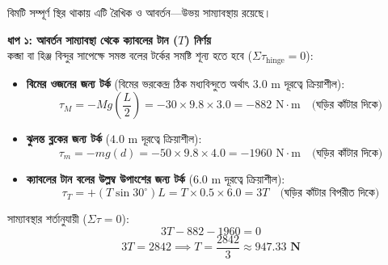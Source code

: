 \documentclass[12pt, a4paper]{article}
\begin{document}
\begin{tcolorbox}[solutionbox={সমাধান (Solution)}]
\noindent
বিমটি সম্পূর্ণ স্থির থাকায় এটি রৈখিক ও আবর্তন—উভয় সাম্যাবস্থায় রয়েছে।

\vspace{0.5em}
\noindent
\textbf{ধাপ ১: আবর্তন সাম্যাবস্থা থেকে ক্যাবলের টান ($T$) নির্ণয়} \\
কব্জা বা হিঞ্জ বিন্দুর সাপেক্ষে সমস্ত বলের টর্কের সমষ্টি শূন্য হতে হবে ($\Sigma \tau_{\text{hinge}} = 0$):
\begin{itemize}[leftmargin=*, parsep=0.4ex]
    \item \textbf{বিমের ওজনের জন্য টর্ক} (বিমের ভরকেন্দ্র ঠিক মধ্যবিন্দুতে অর্থাৎ $3.0\text{ m}$ দূরত্বে ক্রিয়াশীল):
    $$\tau_M = - M g \left(\frac{L}{2}\right) = - 30 \times 9.8 \times 3.0 = -882\text{ N}\cdot\text{m} \quad \text{(ঘড়ির কাঁটার দিকে)}$$
    \item \textbf{ঝুলন্ত ব্লকের জন্য টর্ক} ($4.0\text{ m}$ দূরত্বে ক্রিয়াশীল):
    $$\tau_m = - m g (d) = - 50 \times 9.8 \times 4.0 = -1960\text{ N}\cdot\text{m} \quad \text{(ঘড়ির কাঁটার দিকে)}$$
    \item \textbf{ক্যাবলের টান বলের উল্লম্ব উপাংশের জন্য টর্ক} ($6.0\text{ m}$ দূরত্বে ক্রিয়াশীল):
    $$\tau_T = + (T \sin 30^\circ) L = T \times 0.5 \times 6.0 = 3 T \quad \text{(ঘড়ির কাঁটার বিপরীত দিকে)}$$
\end{itemize}

সাম্যাবস্থার শর্তানুযায়ী ($\Sigma \tau = 0$):
$$3 T - 882 - 1960 = 0$$ 
$$3 T = 2842 \implies T = \frac{2842}{3} \approx \mathbf{947.33\text{ N}}$$

\vspace{1em}
\begin{center}
\end{center}
\end{tcolorbox}
\end{document}

